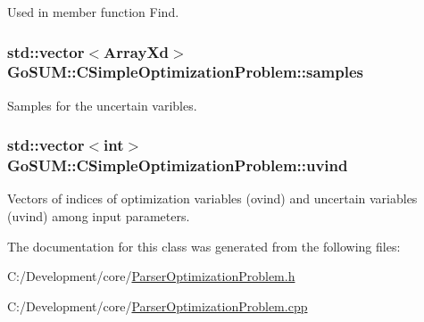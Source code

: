 Used in member function Find. 

\hypertarget{class_go_s_u_m_1_1_c_simple_optimization_problem_acb6bedecb1d9856dba7d3aafa41e5738}{
\subsubsection[{samples}]{\setlength{\rightskip}{0pt plus 5cm}std\-::vector$<$Array\-Xd$>$ Go\-S\-U\-M\-::\-C\-Simple\-Optimization\-Problem\-::samples\hspace{0.3cm}{\ttfamily [protected]}}}\label{class_go_s_u_m_1_1_c_simple_optimization_problem_acb6bedecb1d9856dba7d3aafa41e5738}
Samples for the uncertain varibles. \hypertarget{class_go_s_u_m_1_1_c_simple_optimization_problem_acddbd19e980f3afb8eb0113dfbcc21a1}{
\subsubsection[{uvind}]{\setlength{\rightskip}{0pt plus 5cm}std\-::vector$<$int$>$ Go\-S\-U\-M\-::\-C\-Simple\-Optimization\-Problem\-::uvind\hspace{0.3cm}{\ttfamily [protected]}}}\label{class_go_s_u_m_1_1_c_simple_optimization_problem_acddbd19e980f3afb8eb0113dfbcc21a1}


Vectors of indices of optimization variables (ovind) and uncertain variables (uvind) among input parameters. 



The documentation for this class was generated from the following files\-:\begin{DoxyCompactItemize}
\item 
C\-:/\-Development/core/\hyperlink{_parser_optimization_problem_8h}{Parser\-Optimization\-Problem.\-h}\item 
C\-:/\-Development/core/\hyperlink{_parser_optimization_problem_8cpp}{Parser\-Optimization\-Problem.\-cpp}\end{DoxyCompactItemize}
